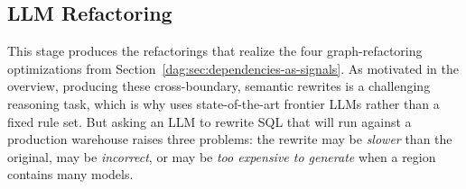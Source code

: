 


\subsection{LLM Refactoring}
\label{dag:sec:llm-refactoring}

This stage produces the refactorings that realize the four graph-refactoring optimizations from Section~\ref{dag:sec:dependencies-as-signals}. As motivated in the overview, producing these cross-boundary, semantic rewrites is a challenging reasoning task, which is why \dagsmith{} uses state-of-the-art frontier LLMs rather than a fixed rule set.
But asking an LLM to rewrite SQL that will run against a production warehouse raises three problems: the rewrite may be \emph{slower} than the original, may be \emph{incorrect}, or may be \emph{too expensive to generate} when a region contains many models.





